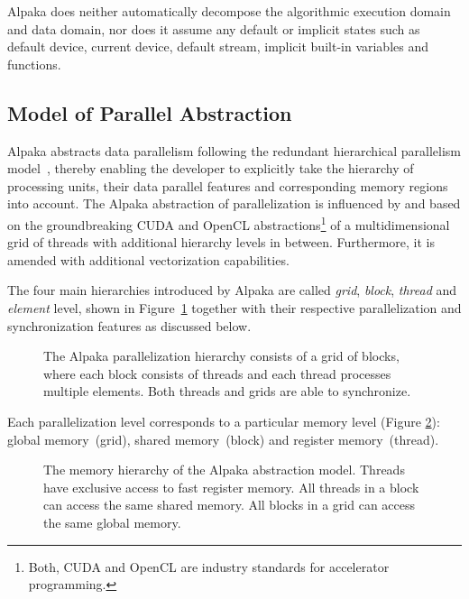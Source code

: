 \documentclass[10pt, twocolumn]{article}
\newcommand{\alpaka}{Alpaka\xspace}
\newcommand{\cuda}{{CUDA}\xspace}
\newcommand{\opencl}{{OpenCL}\xspace}
\begin{document}
\alpaka does neither automatically decompose the algorithmic execution domain and data domain, nor does it assume any default or implicit states such as default device, current device, default stream, implicit built-in variables and functions.

\subsection{Model of Parallel Abstraction}
\label{subsec:model}
\alpaka abstracts data parallelism following the redundant hierarchical parallelism model~\cite{rocki2014future}, thereby enabling the developer to explicitly take the hierarchy of processing units, their data parallel features and corresponding memory regions into account.
The \alpaka abstraction of parallelization is influenced by and based on the groundbreaking \cuda and \opencl abstractions\footnote{Both, \cuda and \opencl are industry standards for accelerator programming.} of a multidimensional grid of threads with additional hierarchy levels in between. Furthermore, it is amended with additional vectorization capabilities.

The four main hierarchies introduced by \alpaka are called \emph{grid}, \emph{block}, \emph{thread} and \emph{element} level, shown in Figure~\ref{fig:model} together with their respective parallelization and synchronization features as discussed below.

\begin{figure}[t]
  \centerline
      {}
      \caption{The \alpaka parallelization hierarchy consists of a grid of blocks, where each block consists of threads and each thread processes multiple elements.
        Both threads and grids are able to synchronize.
      }
      \label{fig:model}
\end{figure}

Each parallelization level corresponds to a particular memory level (Figure \ref{fig:memory}): global memory~(grid), shared memory~(block) and register memory~(thread).

\begin{figure}[th]
  \centerline
      {}
      \caption{The memory hierarchy of the \alpaka abstraction model.
        Threads have exclusive access to fast register memory.
        All threads in a block can access the same shared memory.
        All blocks in a grid can access the same global memory.
      }
      \label{fig:memory}
      \vspace{-0.5em}
\end{figure}
\end{document}
